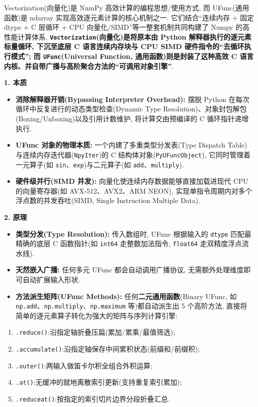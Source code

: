 \documentclass[11pt]{article}
\providecommand{\tightlist}{%
      \setlength{\itemsep}{0pt}\setlength{\parskip}{0pt}}
\begin{document}
    Vectorization(向量化)是 NumPy 高效计算的编程思想/使用方式, 而
UFunc(通用函数)是 ndarray 实现高效逐元素计算的核心机制之一.
它们结合``连续内存 + 固定 dtype + C 层循环 + CPU
向量化/SIMD''等一整套机制共同构建了 Numpy 的高性能计算体系.
\textbf{\texttt{Vectorization}(向量化)是将原本由 Python
解释器执行的逐元素标量循环, 下沉至底层 C 语言连续内存块与 CPU SIMD
硬件指令的``去循环执行模式''; 而 \texttt{UFunc}(Universal Function,
通用函数)则是封装了这种高效 C
语言内核、并自带广播与高阶聚合方法的``可调用对象引擎''}.

\textbf{1. 本质}

\begin{itemize}
\tightlist
\item
  \textbf{消除解释器开销(Bypassing Interpreter Overhead):} 摆脱 Python
  在每次循环中反复进行的动态类型检查(Dynamic Type
  Resolution)、对象封包解包(Boxing/Unboxing)以及引用计数维护,
  将计算交由预编译的 C 循环指针递增执行.
\item
  \textbf{UFunc 对象的物理本质:} 一个内建了多重类型分发表(Type Dispatch
  Table)与连续内存迭代器(\texttt{NpyIter})的 C
  结构体对象(\texttt{PyUFuncObject}), 它同时管理着一元算子(如
  \texttt{sin}、\texttt{exp})与二元算子(如
  \texttt{add}、\texttt{multiply}).
\item
  \textbf{硬件级并行(SIMD 并发):} 向量化使连续内存数据能够直接加载进现代
  CPU 的向量寄存器(如 AVX-512、AVX2、ARM NEON),
  实现单指令周期内对多个浮点数的并发吞吐(SIMD, Single Instruction
  Multiple Data).
\end{itemize}

\textbf{2. 原理}

\begin{itemize}
\tightlist
\item
  \textbf{类型分发(Type Resolution):} 传入数组时, UFunc 根据输入的
  \texttt{dtype} 匹配最精确的底层 C 函数指针(如 \texttt{int64}
  走整数加法指令, \texttt{float64} 走双精度浮点流水线).
\item
  \textbf{天然嵌入广播:} 任何多元 UFunc 都会自动调用广播协议,
  无需额外处理维度即可自动扩展输入形状.
\item
  \textbf{方法派生矩阵(UFunc Methods):} 任何\textbf{二元通用函数}(Binary
  UFunc, 如 \texttt{np.add}、\texttt{np.multiply}、\texttt{np.maximum}
  等)都自动派生出 5 个高阶方法,
  直接将简单的逐元素算子转化为强大的矩阵与序列计算引擎:
\end{itemize}

\begin{enumerate}
\def\labelenumi{\arabic{enumi}.}
\tightlist
\item
  \texttt{.reduce()}:沿指定轴折叠压扁(累加/累乘/最值筛选);
\item
  \texttt{.accumulate()}:沿指定轴保存中间累积状态(前缀和/前缀积);
\item
  \texttt{.outer()}:两输入做笛卡尔积全组合外积运算;
\item
  \texttt{.at()}:无缓冲的就地离散索引更新(支持重复索引累加);
\item
  \texttt{.reduceat()}:按指定的索引切片边界分段折叠汇总.
\end{enumerate}
\end{document}
